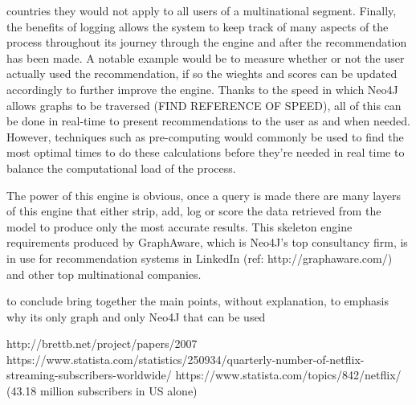 \documentclass[a4paper]{article}
\begin{document}
countries they would not apply to all users of a multinational segment. Finally, the benefits of logging allows the system to keep track of many aspects of the process throughout its journey through the engine and after the recommendation has been made. A notable example would be to measure whether or not the user actually used the recommendation, if so the wieghts and scores can be updated accordingly to further improve the engine. Thanks to the speed in which Neo4J allows graphs to be traversed (FIND REFERENCE OF SPEED), all of this can be done in real-time to present recommendations to the user as and when needed. However, techniques such as pre-computing would commonly be used to find the most optimal times to do these calculations before they're needed in real time to balance the computational load of the process.

The power of this engine is obvious, once a query is made there are many layers of this engine that either strip, add, log or score the data retrieved from the model to produce only the most accurate results. This skeleton engine requirements produced by GraphAware, which is Neo4J's top consultancy firm, is in use for recommendation systems in LinkedIn (ref: http://graphaware.com/) and other top multinational companies.


to conclude bring together the main points, without explanation, to emphasis why its only graph and only Neo4J that can be used


http://brettb.net/project/papers/2007%
https://www.statista.com/statistics/250934/quarterly-number-of-netflix-streaming-subscribers-worldwide/
https://www.statista.com/topics/842/netflix/ (43.18 million subscribers in US alone)
\end{document}
